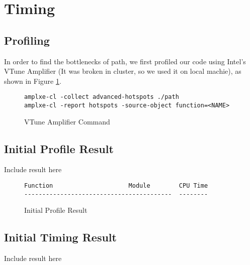 \section{Timing}\label{sec:timing}
\subsection{Profiling}
In order to find the bottlenecks of path, we first profiled our code
using Intel's VTune Amplifier (It was broken in cluster, so we used
it on local machie), as shown in Figure \ref{amplxe-command}.

\begin{figure}[h]
\footnotesize
\begin{verbatim}
amplxe-cl -collect advanced-hotspots ./path
amplxe-cl -report hotspots -source-object function=<NAME>
\end{verbatim}
\caption{VTune Amplifier Command}
\label{amplxe-command}
\end{figure}

\subsection{Initial Profile Result}
Include result here

\begin{figure}[h]
\footnotesize
\begin{verbatim}
Function                     Module        CPU Time
-----------------------------------------  --------
\end{verbatim}
\caption{Initial Profile Result}
\label{initial-profile-result}
\end{figure}

\subsection{Initial Timing Result}

Include result here
